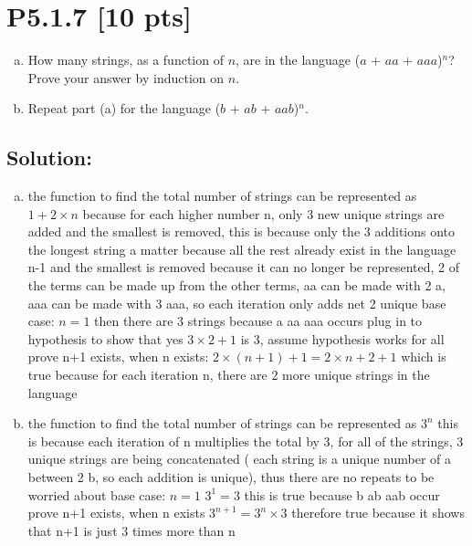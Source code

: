 \documentclass[12pt]{article}
\begin{document}
\newpage
\section*{\textbf{P5.1.7} [10 pts]}
\begin{enumerate}[(a)]
    \item How many strings, as a function of $n$, are in the language ($a$ + $aa$ + $aaa$)$^n$? Prove your answer by induction on $n$.

    \item  Repeat part (a) for the language ($b$ + $ab$ + $aab$)$^n$.
    
\end{enumerate}


\subsection*{\textbf{Solution:}}
\begin{enumerate}[(a)]
    \item the function to find the total number of strings can be represented as $1+2\times n$ because for each higher number n, only 3 new unique strings are added and the smallest is removed, this is because only the 3 additions onto the longest string a matter because all the rest already exist in the language n-1 and the smallest is removed because it can no longer be represented, 2 of the terms can be made up from the other terms, aa can be made with 2 a, aaa can be made with 3 aaa, so each iteration only adds net 2 unique\newline
    base case: $n=1$ then there are 3 strings because a aa aaa occurs\newline
    plug in to hypothesis to show that yes $3 \times 2 + 1$  is 3, assume hypothesis works for all\newline
    prove n+1 exists, when n exists: $2\times (n+1) + 1 = 2\times n + 2 + 1$ which is true because for each iteration n, there are 2 more unique strings in the language 


    \item the function to find the total number of strings can be represented as $3^n$ this is because each iteration of n multiplies the total by 3, for all of the strings, 3 unique strings are being concatenated ( each string is a unique number of a between 2 b, so each addition is unique), thus there are no repeats to be worried about \newline
    base case: $n=1$ $3^1=3$ this is true because b ab aab occur\newline
    prove n+1 exists, when n exists $3^{n+1} = 3^n\times 3$ therefore true because it shows that n+1 is just 3 times more than n
    
\end{enumerate}
\end{document}
